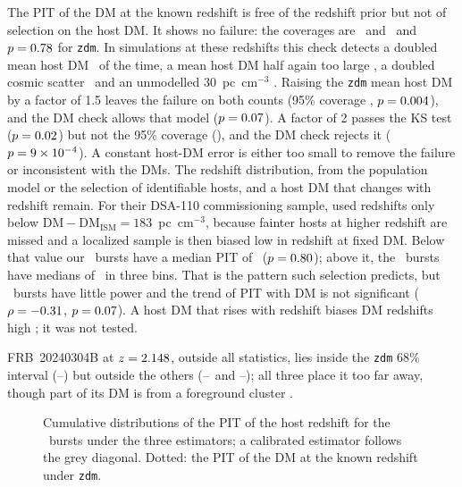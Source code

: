 \documentclass[twocolumn]{aastex631}
\newcommand{\code}[1]{\texttt{#1}}
\begin{document}
The PIT of the DM at the known redshift is free of the redshift prior but not of selection on
the host DM. It shows no failure: the coverages are
\dmzRealDmzOneCovSixtyEight\ and \dmzRealDmzOneCovNinetyFive\ and $p=0.78$ for
\code{zdm}. In simulations at these redshifts this check detects a doubled mean host DM
\dmzSynDmzPowHost\ of the time, a mean host DM half again too large \dmzSynDmzPowHostOneFive,
a doubled cosmic scatter \dmzSynDmzPowF\ and an unmodelled 30~pc~cm$^{-3}$ \dmzSynDmzPowMw.
Raising the \code{zdm} mean host DM by a factor of 1.5 leaves the failure on both counts (95\%
coverage \dmzRealHostOneFiveCovNinetyFive, $p=0.004$), and the DM check
allows that model ($p=0.07$). A factor of 2 passes the KS test
($p=0.02$) but not the 95\% coverage (\dmzRealHostTwoCovNinetyFive), and the DM
check rejects it ($p=9\times10^{-4}$). A constant host-DM error is either too small to
remove the failure or inconsistent with the DMs. The redshift distribution, from the
population model or the selection of identifiable hosts, and a host DM that changes with
redshift remain. For their DSA-110 commissioning sample, \citet{hoffmann2025}
used redshifts only below $\mathrm{DM}-\mathrm{DM_{ISM}}=183$~pc~cm$^{-3}$, because fainter hosts
at higher redshift are missed and a localized sample is then biased low in redshift at fixed DM.
Below that value our \dmzRealBinLowN\ bursts have a median PIT of \dmzRealBinLowMed\
($p=0.80$); above it, the \dmzRealBinHighN\ bursts have medians of
\dmzRealBinHighMedRange\ in three bins. That is the pattern such selection predicts, but
\dmzRealBinLowN\ bursts have little power and the trend of PIT with DM is not significant
($\rho=-0.31$, $p=0.07$). A host DM that rises with redshift biases DM redshifts
high \citep{masribas2026}; it was not tested.

FRB~20240304B \citep{caleb2026} at $z=2.148$, outside all statistics, lies inside the
\code{zdm} 68\% interval (\dmzRealFrbOneLoSixtyEight--\dmzRealFrbOneHiSixtyEight) but outside
the others (\dmzRealFrbTwoLoSixtyEight--\dmzRealFrbTwoHiSixtyEight\ and
\dmzRealFrbThreeLoSixtyEight--\dmzRealFrbThreeHiSixtyEight); all three place it too far away,
though part of its DM is from a foreground cluster \citep{caleb2026}.

\begin{figure}
\caption{Cumulative distributions of the PIT of the host redshift for the \dmzRealNCert\
bursts under the three estimators; a calibrated estimator follows the grey diagonal. Dotted:
the PIT of the DM at the known redshift under \code{zdm}.}
\label{fig:pit}
\end{figure}
\end{document}
